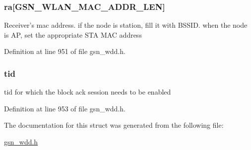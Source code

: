 \hypertarget{a00269_a1d97eb2e070b4a95218b41f6abbff9d7}{
\subsubsection[{ra}]{ {\bf ra}\mbox{[}GSN\_\-WLAN\_\-MAC\_\-ADDR\_\-LEN\mbox{]}}}
\label{a00269_a1d97eb2e070b4a95218b41f6abbff9d7}
Receiver's mac address. if the node is station, fill it with BSSID. when the node is AP, set the appropriate STA MAC address 

Definition at line 951 of file gsn\_\-wdd.h.

\hypertarget{a00269_abf69ed815c8482f9995e41bc0aff9043}{
\subsubsection[{tid}]{ {\bf tid}}}
\label{a00269_abf69ed815c8482f9995e41bc0aff9043}
tid for which the block ack session needs to be enabled 

Definition at line 953 of file gsn\_\-wdd.h.



The documentation for this struct was generated from the following file:\begin{DoxyCompactItemize}
\item 
\hyperlink{a00603}{gsn\_\-wdd.h}\end{DoxyCompactItemize}
